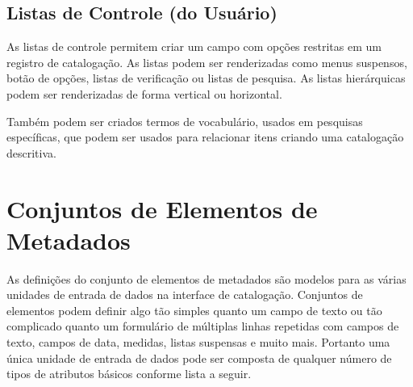 \subsection{Listas de Controle (do Usuário)}

As listas de controle permitem criar um campo com opções restritas em um registro de catalogação. As listas podem ser renderizadas como menus suspensos, botão de opções, listas de verificação ou listas de pesquisa. As listas hierárquicas podem ser renderizadas de forma vertical ou horizontal.

Também podem ser criados termos de vocabulário, usados em pesquisas específicas, que podem ser usados para relacionar itens criando uma catalogação descritiva.

\section{Conjuntos de Elementos de Metadados}

As definições do conjunto de elementos de metadados são modelos para as várias unidades de entrada de dados na interface de catalogação. Conjuntos de elementos podem definir algo tão simples quanto um campo de texto ou tão complicado quanto um formulário de múltiplas linhas repetidas com campos de texto, campos de data, medidas, listas suspensas e muito mais. Portanto uma única unidade de entrada de dados pode ser composta de qualquer número de tipos de atributos básicos conforme lista a seguir.

